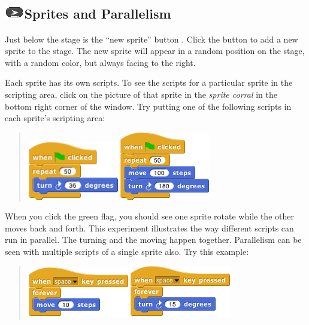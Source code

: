 \subsection[\hl{\hfill\break
}Sprites and Parallelism]{\texorpdfstring{\hl{\hfill\break
}\protect\includegraphics[width=0.34028in,height=0.24306in]{media/image25.png}Sprites
and
Parallelism}{ Sprites and Parallelism}}\label{sprites-and-parallelism}

Just below the stage is the ``new sprite'' button . Click the button to
add a new sprite to the stage. The new sprite will appear in a random
position on the stage, with a random color, but always facing to the
right.

Each sprite has its own scripts. To see the scripts for a particular
sprite in the scripting area, click on the picture of that sprite in the
\emph{sprite corral} in the bottom right corner of the window. Try
putting one of the following scripts in each sprite's scripting area:

\begin{quote}
\includegraphics[width=1.55069in,height=0.99375in]{media/image26.png}
\includegraphics[width=1.54167in,height=1.16667in]{media/image27.png}
\end{quote}

When you click the green flag, you should see one sprite rotate while
the other moves back and forth. This experiment illustrates the way
different scripts can run in parallel. The turning and the moving happen
together. Parallelism can be seen with multiple scripts of a single
sprite also. Try this example:

\begin{quote}
\includegraphics[width=1.72917in,height=0.875in]{media/image28.png}
\includegraphics[width=1.72917in,height=0.89583in]{media/image29.png}
\end{quote}

